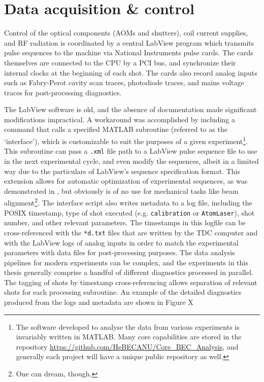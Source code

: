 	


\section{Data acquisition \& control}

	Control of the optical components (AOMs and shutters), coil current supplies, and RF radiation is coordinated by a central LabView program which transmits pulse sequences to the machine via National Instruments pulse cards. The cards themselves are connected to the CPU by a PCI bus, and synchronize their internal clocks at the beginning of each shot. The cards also record analog inputs such as Fabry-Perot cavity scan traces, photodiode traces, and mains voltage traces for post-processing diagnostics.

	The LabView software is old, and the absence of documentation made significant modifications impractical. A workaround was accomplished by including a command that calls a specified MATLAB subroutine (referred to as the `interface'), which is customizable to suit the purposes of a given experiment\footnote{The software developed to analyse the data from various experiments is invariably written in MATLAB. Many core capabilities are stored in the repository \url{https://github.com/HeBECANU/Core_BEC_Analysis}, and generally each project will have a unique public repository as well.	}. This subroutine can pass a \verb|.xml| file path to a LabView pulse sequence file to use in the next experimental cycle, and even modify the sequences, albeit in a limited way due to the particulars of LabView's sequence specification format. This extension allows for automatic optimization of experimental sequences, as was demonstrated in \cite{HensonML}, but obviously is of no use for mechanical tasks like beam alignment\footnote{One can dream, though.}. 
	The interface script also writes metadata to a log file, including the POSIX timestamp, type of shot executed (e.g. \verb|calibration| or \verb|AtomLaser|), shot number, and other relevant parameters. The timestamps in this logfile can be cross-referenced with the \verb|*d.txt| files that are written by the TDC computer and with the LabView logs of analog inputs in order to match the experimental parameters with data files for post-processing purposes. The data analysis pipelines for modern experiments can be complex, and the experiments in this thesis generally comprise a handful of different diagnostics processed in parallel. The tagging of shots by timestamp cross-referencing allows separation of relevant shots for each processing subroutine. 
	An example of the detailed diagnostics produced from the logs and metadata are shown in Figure X 

